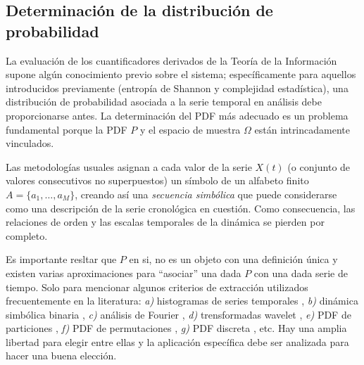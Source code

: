 \subsection{Determinación de la distribución de probabilidad}

La evaluación de los cuantificadores derivados de la Teoría de la Información supone algún conocimiento previo sobre el sistema; específicamente para aquellos introducidos previamente (entropía de Shannon y complejidad estadística), una distribución de probabilidad asociada a la serie temporal en análisis debe proporcionarse antes.
La determinación del PDF más adecuado es un problema fundamental porque la PDF $P$ y el espacio de muestra $\Omega$ están intrincadamente vinculados.

Las metodologías usuales asignan a cada valor de la serie $X(t)$ (o conjunto de valores consecutivos no superpuestos) un símbolo de un alfabeto finito $A = \{a_1, \dots, a_M \}$, creando así una {\it secuencia simbólica \/} que puede considerarse como una descripción de la serie cronológica en cuestión.
Como consecuencia, las relaciones de orden y las escalas temporales de la dinámica se pierden por completo.

Es importante resltar que $P$ en si, no es un objeto con una definición única y existen varias aproximaciones para ``asociar'' una dada $P$ con una dada serie de tiempo.
Solo para mencionar algunos criterios de extracción utilizados frecuentemente en la literatura: {\it a)\/} histogramas de series temporales \cite{Martin2004}, {\it b)\/} dinámica simbólica binaria \cite{Mischaikow1999}, {\it c)\/} análisis de Fourier \cite{Powell1979}, {\it d)\/} trensformadas wavelet \cite{Blanco1998,Rosso2001}, {\it e)\/} PDF de particiones \cite{Ebeling2001}, {\it f)\/} PDF de permutaciones \cite{Pompe2002,Keller2005}, {\it g)\/} PDF discreta \cite{Amigo2007}, etc.
Hay una amplia libertad para elegir entre ellas y la aplicación específica debe ser analizada para hacer una buena elección.

